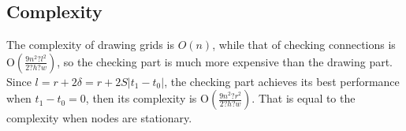 \subsection{Complexity}

\noindent The complexity of drawing grids is $O\left(n\right)$, while that of checking connections is $\mathrm{O}\left(\frac{9n^2\mathrm{?}l^2}{2\mathrm{?}h\mathrm{?}w}\right)$, so the checking part is much more expensive than the drawing part. Since $l=r+2\delta =r+2S\left|t_1-t_0\right|$, the checking part achieves its best performance when $t_1-t_0=0$, then its complexity is $\mathrm{O}\left(\frac{9n^2\mathrm{?}r^2}{2\mathrm{?}h\mathrm{?}w}\right)$. That is equal to the complexity when nodes are stationary.

















